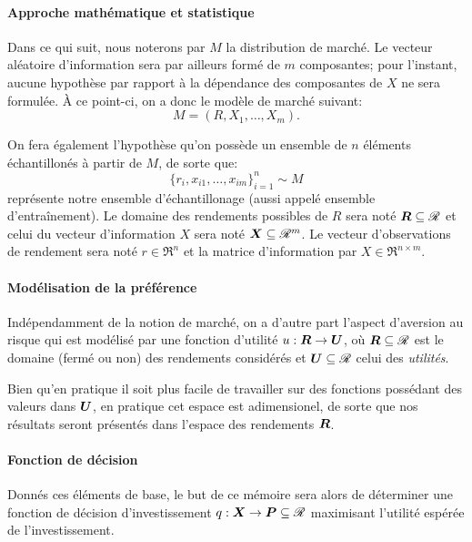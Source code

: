 \paragraph{Approche mathématique et statistique}

Dans ce qui suit, nous noterons par $M$ la distribution de marché. Le vecteur aléatoire
d'information sera par ailleurs formé de $m$ composantes; pour l'instant, aucune hypothèse
par rapport à la dépendance des composantes de $X$ ne sera formulée. À ce point-ci, on a
donc le modèle de marché suivant:
\begin{equation}
  M = (R,X_1, \ldots, X_m).
\end{equation}

On fera également l'hypothèse qu'on possède un ensemble de $n$ éléments échantillonés à
partir de $M$, de sorte que:
\begin{equation}
  \{r_i, x_{i1}, \ldots, x_{im}\}_{i=1}^n \sim M
\end{equation}
représente notre ensemble d'échantillonage (aussi appelé ensemble d'entraînement). Le
domaine des rendements possibles de $R$ sera noté $\bm{R} \subseteq \mathscr{R}$ et celui du vecteur
d'information $X$ sera noté $\bm{X} \subseteq \mathscr{R}^m$. Le vecteur d'observations de rendement sera noté
$r \in \Re^n$ et la matrice d'information par $X \in \Re^{n \times m}$.



\paragraph{Modélisation de la préférence}

Indépendamment de la notion de marché, on a d'autre part l'aspect d'aversion au risque qui
est modélisé par une fonction d'utilité $u:\bm{R}\to\bm{U}$, où $\bm{R} \subseteq \mathscr{R}$ est le domaine (fermé ou
non) des rendements considérés et $\bm{U} \subseteq \mathscr{R}$ celui des \textit{utilités}.

Bien qu'en pratique il soit plus facile de travailler sur des fonctions possédant des
valeurs dans $\bm{U}$, en pratique cet espace est adimensionel\cit, de sorte que nos résultats
seront présentés dans l'espace des rendements $\bm{R}$.


\paragraph{Fonction de décision}

Donnés ces éléments de base, le but de ce mémoire sera alors de déterminer une fonction de
décision d'investissement $q: \bm{X} \to \bm{P} \subseteq \mathscr{R}$ maximisant l'utilité espérée de l'investissement.

